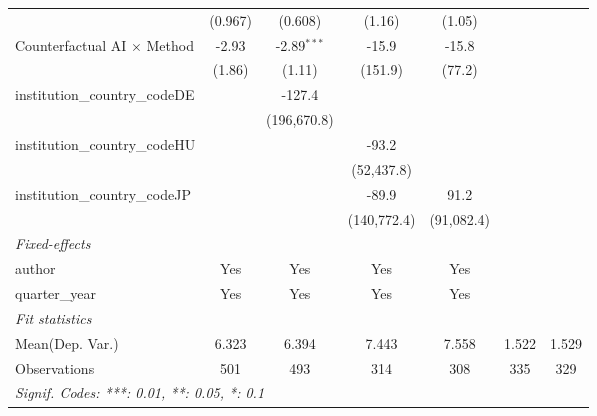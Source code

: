 \begin{tabular}{lcccccc}
                                      & (0.967)      & (0.608)       & (1.16)      & (1.05)      &     &   \\   
   Counterfactual AI $\times$ Method  & -2.93        & -2.89$^{***}$ & -15.9       & -15.8       &     &   \\   
                                      & (1.86)       & (1.11)        & (151.9)     & (77.2)      &     &   \\   
   institution\_country\_codeDE       &              & -127.4        &             &             &     &   \\   
                                      &              & (196,670.8)   &             &             &     &   \\   
   institution\_country\_codeHU       &              &               & -93.2       &             &     &   \\   
                                      &              &               & (52,437.8)  &             &     &   \\   
   institution\_country\_codeJP       &              &               & -89.9       & 91.2        &     &   \\   
                                      &              &               & (140,772.4) & (91,082.4)  &     &   \\   
   \midrule
   \emph{Fixed-effects}\\
   author                             & Yes          & Yes           & Yes         & Yes         &     & \\  
   quarter\_year                      & Yes          & Yes           & Yes         & Yes         &     & \\  
   \midrule
   \emph{Fit statistics}\\
Mean(Dep. Var.) & 6.323 & 6.394 & 7.443 & 7.558 & 1.522 & 1.529 \\
   Observations                       & 501          & 493           & 314         & 308         & 335 & 329\\  
   \midrule \midrule
   \multicolumn{7}{l}{\emph{Signif. Codes: ***: 0.01, **: 0.05, *: 0.1}}\\
\end{tabular}
\par\endgroup
